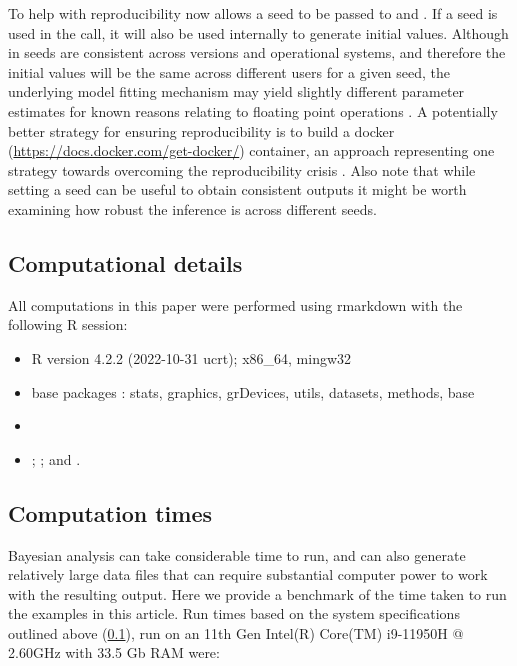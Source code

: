 \documentclass[
  shortnames]{jss}
\begin{document}
To help with reproducibility  now allows a seed to be passed to  and . If a seed is used in the  call, it will also be used internally to generate initial values. Although in  seeds are consistent across versions and operational systems, and therefore the initial values will be the same across different users for a given seed, the underlying  model fitting mechanism may yield slightly different parameter estimates for known reasons relating to floating point operations \citep[see chapter 20 in][]{stan2021}. A potentially better strategy for ensuring reproducibility is to build a docker (\url{https://docs.docker.com/get-docker/}) container, an approach representing one strategy towards overcoming the reproducibility crisis \citep{Baker2016}. Also note that while setting a seed can be useful to obtain consistent outputs it might be worth examining how robust the inference is across different seeds.

\subsection[Computational detail]{Computational details}\label{compdetails}

All computations in this paper were performed using rmarkdown \citep{allaire2023} with the following
R session:

\begin{itemize}
\item
  R version 4.2.2 (2022-10-31 ucrt); x86\_64, mingw32
\item
  base packages \citep{rcore}: stats, graphics, grDevices, utils, datasets, methods, base
\item
   \citep{bayesnec2103}
\item
   \citep{Burkner2017};  \citep{ggplot}; and  \citep{rcpp}.
\end{itemize}

\hypertarget{computation-times}{%
\subsection{Computation times}\label{computation-times}}

Bayesian analysis can take considerable time to run, and can also generate relatively large data files that can require substantial computer power to work with the resulting output. Here we provide a benchmark of the time taken to run the examples in this article. Run times based on the system specifications outlined above (\ref{compdetails}), run on an 11th Gen Intel(R) Core(TM) i9-11950H @ 2.60GHz with 33.5 Gb RAM were:
\end{document}
